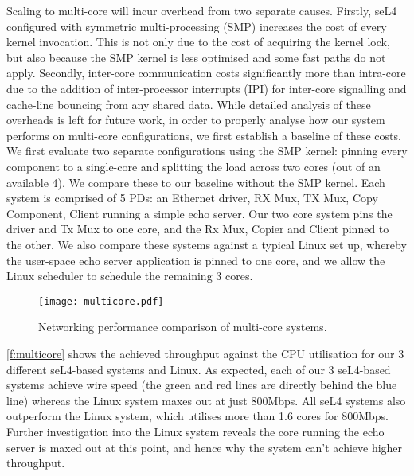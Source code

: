 Scaling to multi-core will incur overhead from two separate causes. Firstly, seL4 configured with symmetric multi-processing (SMP) increases
the cost of every kernel invocation. This is not only due to the cost of acquiring the kernel lock, but also because the SMP kernel is
less optimised and some fast paths do not apply. Secondly, inter-core communication costs significantly more than intra-core due to the addition of 
inter-processor interrupts (IPI) for inter-core signalling and cache-line bouncing from any shared data. While detailed analysis of
these overheads is left for future work, in order to properly
analyse how our system performs on multi-core configurations, we first establish a baseline of these costs. We first evaluate two separate configurations
using the SMP kernel: pinning every component to a single-core and splitting the load across two cores (out of an available 4). 
We compare these to our baseline without the SMP kernel. Each system is comprised of 5 PDs: an Ethernet driver, RX Mux, 
TX Mux, Copy Component, Client running a simple echo server. Our two core system pins the driver and Tx Mux to one core, and 
the Rx Mux, Copier and Client pinned to the other. We also compare these systems against a typical Linux set up, whereby
the user-space echo server application is pinned to one core, and we allow the Linux scheduler to schedule the remaining 3 cores.\\ 

\begin{figure}[H]
    \centering
    \texttt{[image: multicore.pdf]}
    \caption{Networking performance comparison of multi-core systems.}
    \label{f:multicore}
\end{figure}

\autoref{f:multicore} shows the achieved throughput against the CPU utilisation for our 3 different seL4-based systems and Linux. 
As expected, each of our 3 seL4-based systems achieve wire speed (the green and red lines are directly behind the blue line)
whereas the Linux system maxes out at just 800Mbps. All seL4 systems also outperform the Linux system, which utilises more than
1.6 cores for 800Mbps. Further investigation into the Linux system reveals the core running the echo server is maxed out at 
this point, and hence why the system can't achieve higher throughput. \\

